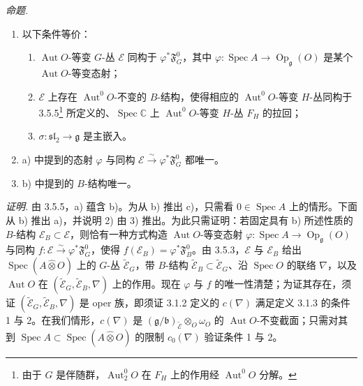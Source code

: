  \emph{命题.}
\begin{enumerate}[label=\arabic*),leftmargin=2.2em]
\item 以下条件等价：
\begin{enumerate}[label=\alph*),leftmargin=2.2em]
\item $\operatorname{Aut}O$-等变 $G$-丛 $\mathcal{E}$ 同构于 $\varphi^{*}\mathfrak{F}^{0}_{G}$，其中 $\varphi:\operatorname{Spec}A\to\operatorname{Op}_{\mathfrak{g}}(O)$ 是某个 $\operatorname{Aut}O$-等变态射；
\item $\mathcal{E}$ 上存在 $\operatorname{Aut}^{0}O$-不变的 $B$-结构，使得相应的 $\operatorname{Aut}^{0}O$-等变 $H$-丛同构于 3.5.5\footnote{由于 $G$ 是伴随群，$\operatorname{Aut}_{2}^{0}O$ 在 $F_{H}$ 上的作用经 $\operatorname{Aut}^{0}O$ 分解。} 所定义的、$\operatorname{Spec}\mathbb{C}$ 上 $\operatorname{Aut}^{0}O$-等变 $H$-丛 $F_{H}$ 的拉回；
\item $\sigma:\mathfrak{sl}_{2}\to\mathfrak{g}$ 是主嵌入。
\end{enumerate}
\item a) 中提到的态射 $\varphi$ 与同构 $\mathcal{E}\xrightarrow{\sim}\varphi^{*}\mathfrak{F}^{0}_{G}$ 都唯一。
\item b) 中提到的 $B$-结构唯一。
\end{enumerate}

\emph{证明.} 由 3.5.5，a) 蕴含 b)。为从 b) 推出 c)，只需看 $0\in\operatorname{Spec}A$ 上的情形。下面从 b) 推出 a)，并说明 2) 由 3) 推出。为此只需证明：若固定具有 b) 所述性质的 $B$-结构 $\mathcal{E}_{B}\subset\mathcal{E}$，则恰有一种方式构造 $\operatorname{Aut}O$-等变态射 $\varphi:\operatorname{Spec}A\to\operatorname{Op}_{\mathfrak{g}}(O)$ 与同构 $f:\mathcal{E}\xrightarrow{\sim}\varphi^{*}\mathfrak{F}^{0}_{G}$，使得 $f(\mathcal{E}_{B})=\varphi^{*}\mathfrak{F}^{0}_{B}$。由 3.5.3，$\mathcal{E}$ 与 $\mathcal{E}_{B}$ 给出 $\operatorname{Spec}(A\widehat\otimes O)$ 上的 $G$-丛 $\widetilde{\mathcal{E}}_{G}$，带 $B$-结构 $\widetilde{\mathcal{E}}_{B}\subset\widetilde{\mathcal{E}}_{G}$、沿 $\operatorname{Spec}O$ 的联络 $\nabla$，以及 $\operatorname{Aut}O$ 在 $(\widetilde{\mathcal{E}}_{G},\widetilde{\mathcal{E}}_{B},\nabla)$ 上的作用。现在 $\varphi$ 与 $f$ 的唯一性清楚；为证其存在，须证 $(\widetilde{\mathcal{E}}_{G},\widetilde{\mathcal{E}}_{B},\nabla)$ 是 oper 族，即须证 3.1.2 定义的 $c(\nabla)$ 满足定义 3.1.3 的条件 1 与 2。在我们情形，$c(\nabla)$ 是 $(\mathfrak{g}/\mathfrak{b})_{\widetilde{\mathcal{E}}}\otimes_{O}\omega_{O}$ 的 $\operatorname{Aut}O$-不变截面；只需对其到 $\operatorname{Spec}A\subset\operatorname{Spec}(A\widehat\otimes O)$ 的限制 $c_{0}(\nabla)$ 验证条件 1 与 2。

